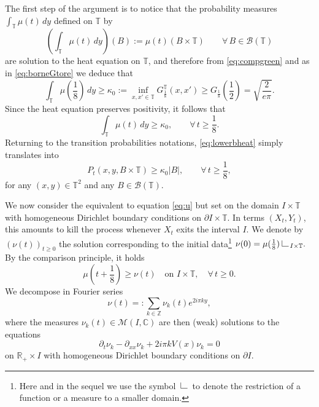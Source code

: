 \documentclass[12pt]{article}
\newcommand{\R}{\mathbb{R}}
\newcommand{\C}{\mathbb{C}}
\newcommand{\Z}{\mathbb{Z}}
\newcommand{\T}{\mathbb{T}}
\def\rest{\hskip 1pt{\hbox to 10.8pt{\hfill
\vrule height 7pt width 0.4pt depth 0pt\hbox{\vrule height 0.4pt
width 7.6pt depth 0pt}\hfill}}}
\begin{document}
\medskip

The first step of the argument is to notice that the probability 
measures $\int_{\T} \mu(t)\, dy$ defined on $\T$ by 
$$
\left(\int_{\T}\mu(t)\, dy \right)(B) := \mu(t)(B \times \T) \qquad \forall\, B \in \mathcal{B}(\T)
$$
are solution to the heat equation on $\T$, and therefore from \eqref{eq:compgreen} 
and as in  \eqref{eq:borneGtore} we deduce that 
\begin{equation*}\label{eq:borneGraison} 
\int_{\T}\mu(\frac{1}{8}) \, dy \geq \kappa_0 := \inf_{x,x' \in \T} 
G_\frac18^\T(x,x') \geq G_\frac18(\frac 12) = \sqrt{\frac{2}{e\pi}}.  
\end{equation*}
Since the heat equation preserves positivity, it 
follows that 
\begin{equation}\label{eq:lowerbheat}
\int_{\T}\mu(t) \, dy \geq \kappa_0, \qquad \forall\,
t \geq \frac18.
\end{equation}
Returning to the transition probabilities notations, \eqref{eq:lowerbheat} 
simply translates into 
\begin{equation*}
P_t(x,y,B \times \T) \geq \kappa_0 |B|, \qquad \forall\,
t \geq \frac18,
\end{equation*}
for any  $(x,y) \in \T^2$ and any $B \in \mathcal{B}(\T)$.

We now consider the equivalent to equation \eqref{eq:u} but set on the 
domain $I \times \T$ with homogeneous Dirichlet boundary conditions
on $\partial I \times \T.$ In terms $(X_t, Y_t)$, this amounts 
to kill the process whenever $X_t$ exits the interval $I.$ We denote by
$(\nu(t))_{t \geq 0}$ the solution corresponding to the initial
data\footnote{Here and in the sequel we use the symbol $\rest$ to denote the 
restriction of a function or a measure to a smaller domain.} 
$\nu(0) = \mu(\frac18) \rest_{I \times \T}.$ By the comparison
principle, it holds
\begin{equation}\label{eq:comparemunu}
\mu(t + \frac18) \geq \nu(t) \quad\text{on } I \times \T,\quad  \forall\, t \geq 0.
\end{equation}
We decompose in Fourier series 
$$
\nu(t) =: \sum_{k \in \Z} \nu_k(t) e^{2i\pi ky},
$$
where the measures $\nu_k(t) \in \mathcal{M}(I, \C)$ are then 
(weak) solutions to the equations 
\begin{equation}\label{eq:fouriernu}
\partial_t \nu_k - \partial_{xx} \nu_k + 2i\pi kV(x)\nu_k = 0
\end{equation}
on $\R_+ \times I$ with homogeneous Dirichlet boundary 
conditions on $\partial I$.
\end{document}
